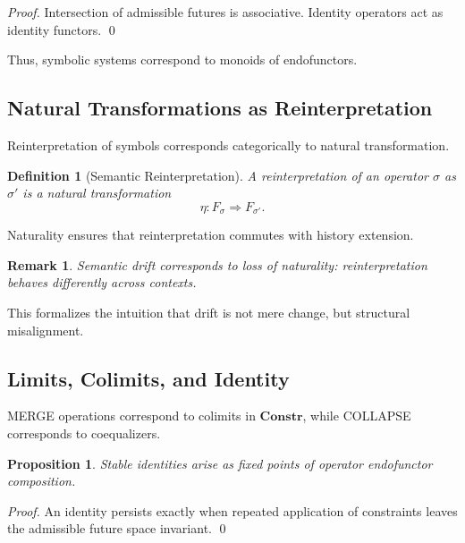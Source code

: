 \documentclass[11pt]{article}
\newtheorem{definition}{Definition}
\newtheorem{proposition}{Proposition}
\newtheorem{remark}{Remark}
\begin{document}
\begin{proof}
Intersection of admissible futures is associative. Identity operators act as
identity functors. \qed
\end{proof}

Thus, symbolic systems correspond to monoids of endofunctors.

\subsection{Natural Transformations as Reinterpretation}

Reinterpretation of symbols corresponds categorically to natural transformation.

\begin{definition}[Semantic Reinterpretation]
A reinterpretation of an operator $\sigma$ as $\sigma'$ is a natural
transformation
\[
\eta : F_\sigma \Rightarrow F_{\sigma'}.
\]
\end{definition}

Naturality ensures that reinterpretation commutes with history extension.

\begin{remark}
Semantic drift corresponds to loss of naturality: reinterpretation behaves
differently across contexts.
\end{remark}

This formalizes the intuition that drift is not mere change, but structural
misalignment.

\subsection{Limits, Colimits, and Identity}

MERGE operations correspond to colimits in $\mathbf{Constr}$, while COLLAPSE
corresponds to coequalizers.

\begin{proposition}
Stable identities arise as fixed points of operator endofunctor composition.
\end{proposition}

\begin{proof}
An identity persists exactly when repeated application of constraints leaves the
admissible future space invariant. \qed
\end{proof}
\end{document}
